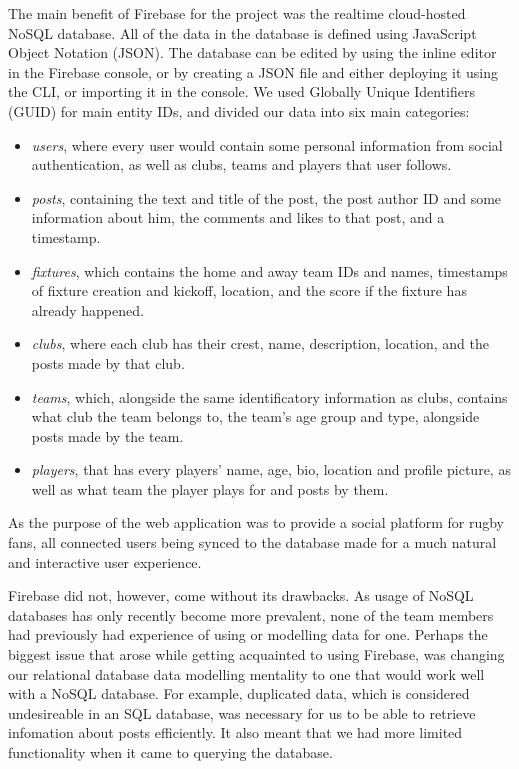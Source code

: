 \documentclass{l3proj}
\begin{document}
The main benefit of Firebase for the project was the realtime cloud-hosted
 NoSQL database. All of the data in the database is defined using JavaScript
 Object Notation (JSON). The database can be edited by using the inline editor
 in the Firebase console, or by creating a JSON file and either deploying it
 using the CLI, or importing it in the console. We used Globally Unique
 Identifiers (GUID) for main entity IDs, and divided our data into six main categories:
\begin{itemize}
\item
\textit{users}, where every user would contain some personal information
 from social authentication, as well as clubs, teams and players that user
 follows.

\item
\textit{posts}, containing the text and title of the post, the post
 author ID and some information about him, the comments and likes to
 that post, and a timestamp.

\item
\textit{fixtures}, which contains the home and away team IDs and names,
 timestamps of fixture creation and kickoff, location, and the score if
 the fixture has already happened.

\item
\textit{clubs}, where each club has their crest, name, description,
location, and the posts made by that club.

\item
\textit{teams}, which, alongside the same identificatory information as
clubs, contains what club the team belongs to, the team's age group and
type, alongside posts made by the team.

\item
\textit{players}, that has every players' name, age, bio, location and
 profile picture, as well as what team the player plays for and posts
 by them.

\end{itemize}
As the purpose of the web application was to provide a social platform for
 rugby fans, all connected users being synced to the database made for a much
 natural and interactive user experience.



Firebase did not, however, come without its drawbacks. As usage of NoSQL
 databases has only recently become more prevalent, none of the team members
 had previously had experience of using or modelling data for one. Perhaps
 the biggest issue that arose while getting acquainted to using Firebase, was
 changing our relational database data modelling mentality to one that would work
 well with a NoSQL database. For example, duplicated data, which is considered
 undesireable in an SQL database, was necessary for us to be able to retrieve
 infomation about posts efficiently. It also meant that we had more limited
 functionality when it came to querying the database.
\end{document}
